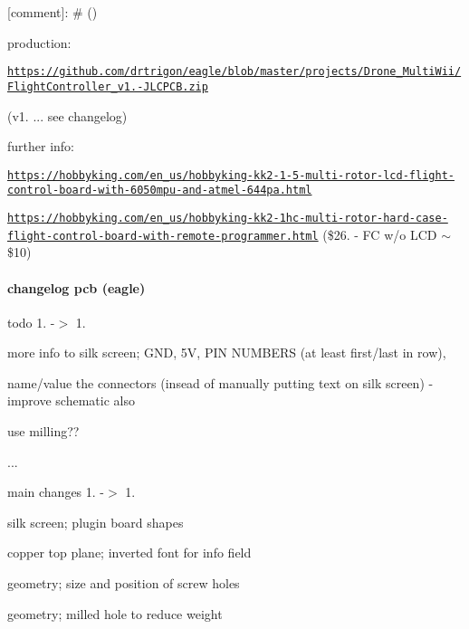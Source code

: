 \mbox{[}comment\mbox{]}\-: \# ()

production\-:
\begin{DoxyItemize}
\item \href{https://github.com/drtrigon/eagle/blob/master/projects/Drone_MultiWii/FlightController_v1.0-JLCPCB.zip}{\tt https\-://github.\-com/drtrigon/eagle/blob/master/projects/\-Drone\-\_\-\-Multi\-Wii/\-Flight\-Controller\-\_\-v1.-\/\-J\-L\-C\-P\-C\-B.\-zip}
\item (v1. ... see changelog)
\end{DoxyItemize}

further info\-:
\begin{DoxyItemize}
\item \href{https://hobbyking.com/en_us/hobbyking-kk2-1-5-multi-rotor-lcd-flight-control-board-with-6050mpu-and-atmel-644pa.html}{\tt https\-://hobbyking.\-com/en\-\_\-us/hobbyking-\/kk2-\/1-\/5-\/multi-\/rotor-\/lcd-\/flight-\/control-\/board-\/with-\/6050mpu-\/and-\/atmel-\/644pa.\-html}
\item \href{https://hobbyking.com/en_us/hobbyking-kk2-1hc-multi-rotor-hard-case-flight-control-board-with-remote-programmer.html}{\tt https\-://hobbyking.\-com/en\-\_\-us/hobbyking-\/kk2-\/1hc-\/multi-\/rotor-\/hard-\/case-\/flight-\/control-\/board-\/with-\/remote-\/programmer.\-html} (\$26. -\/ F\-C w/o L\-C\-D $\sim$\$10)
\end{DoxyItemize}

\paragraph*{changelog pcb (eagle)}

todo 1. -\/$>$ 1.


\begin{DoxyItemize}
\item more info to silk screen; G\-N\-D, 5\-V, P\-I\-N N\-U\-M\-B\-E\-R\-S (at least first/last in row),
\item name/value the connectors (insead of manually putting text on silk screen) -\/ improve schematic also
\item use milling??
\item ...
\end{DoxyItemize}

main changes 1. -\/$>$ 1.


\begin{DoxyItemize}
\item silk screen; plugin board shapes
\item copper top plane; inverted font for info field
\item geometry; size and position of screw holes
\item geometry; milled hole to reduce weight
\end{DoxyItemize}

